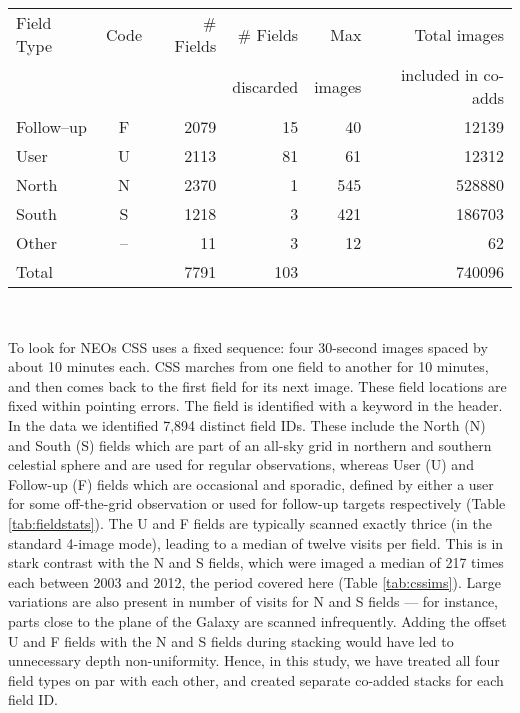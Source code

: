 \documentclass[fleqn,usenatbib]{mnras}
\begin{document}
\begin{table*}
\begin{center}
\begin{tabular}{lcrrrr}
\hline
Field Type  &  Code  &  \# Fields  &  \# Fields  &  Max  &  Total images\\
&  &  &  discarded  &  images  &  included in co-adds\\
\hline
Follow--up & F & 2079 & 15 & 40 & 12139 \\
User & U & 2113 & 81 & 61 & 12312 \\
North & N & 2370 & 1 & 545 & 528880 \\
South & S & 1218 & 3 & 421 & 186703 \\
Other & -- & 11 & 3 & 12 & 62 \\
\hline
Total &  &7791 & 103 & & 740096 \\
\hline
\end{tabular}\\
\caption{\label{tab:fieldstats}CSS images taken in Follow-up, User, N and S modes. }
\end{center}
\end {table*}

To look for NEOs CSS uses a fixed sequence: four 30-second images spaced by about 10 minutes each. CSS marches from one field to another for 10 minutes, and then comes back to the first field for its next image.  These field locations are fixed within pointing errors. The field is identified with a keyword in the header.  In the data we identified 7,894 distinct field IDs. These include the North (N) and South (S) fields which are part of an all-sky grid in northern and southern celestial sphere and are used for regular observations, whereas User (U) and Follow-up (F) fields which are occasional and sporadic, defined by either a user for some off-the-grid observation or used for follow-up targets respectively (Table \ref{tab:fieldstats}). The U and F fields are typically scanned exactly thrice (in the standard 4-image mode), leading to a median of twelve visits per field. This is in stark contrast with the N and S fields, which were imaged a median of 217 times each between 2003 and 2012, the period covered here (Table \ref{tab:cssims}). Large variations are also present in number of visits for N and S fields --- for instance, parts close to the plane of the Galaxy are scanned infrequently. Adding the offset U and F fields with the N and S fields during stacking would have led to unnecessary depth non-uniformity. Hence, in this study, we have treated all four field types on par with each other, and created separate co-added stacks for each field ID.
\end{document}
